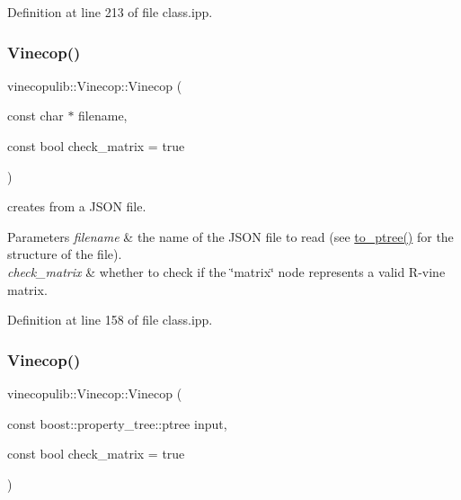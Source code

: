 Definition at line 213 of file class.\+ipp.

\mbox{\label{classvinecopulib_1_1_vinecop_ac77c6f78b0e2c7860d7406c9ea7fe251}} 
\subsubsection{\texorpdfstring{Vinecop()}{Vinecop()}\hspace{0.1cm}{\footnotesize\ttfamily [12/13]}}
{\footnotesize\ttfamily vinecopulib\+::\+Vinecop\+::\+Vinecop (\begin{DoxyParamCaption}\item[{const char $\ast$}]{filename,  }\item[{const bool}]{check\+\_\+matrix = {\ttfamily true} }\end{DoxyParamCaption})\hspace{0.3cm}{\ttfamily [inline]}}



creates from a J\+S\+ON file. 


\begin{DoxyParams}{Parameters}
{\em filename} & the name of the J\+S\+ON file to read (see \hyperlink{classvinecopulib_1_1_vinecop_aaee91f92acc8402eb7358b65c8fe63f8}{to\+\_\+ptree()} for the structure of the file). \\
\hline
{\em check\+\_\+matrix} & whether to check if the {\ttfamily \char`\"{}matrix\char`\"{}} node represents a valid R-\/vine matrix. \\
\hline
\end{DoxyParams}


Definition at line 158 of file class.\+ipp.

\mbox{\label{classvinecopulib_1_1_vinecop_a83e7fdc7c3aef45d8431005b5d1abb83}} 
\subsubsection{\texorpdfstring{Vinecop()}{Vinecop()}\hspace{0.1cm}{\footnotesize\ttfamily [13/13]}}
{\footnotesize\ttfamily vinecopulib\+::\+Vinecop\+::\+Vinecop (\begin{DoxyParamCaption}\item[{const boost\+::property\+\_\+tree\+::ptree}]{input,  }\item[{const bool}]{check\+\_\+matrix = {\ttfamily true} }\end{DoxyParamCaption})\hspace{0.3cm}{\ttfamily [inline]}}



